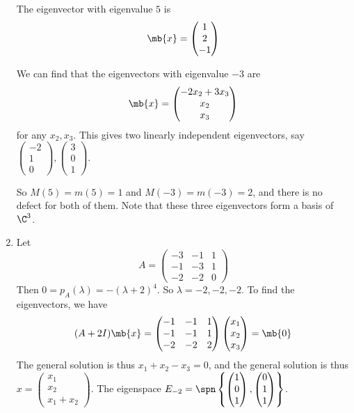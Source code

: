 \documentclass[a4paper]{article}
\begin{document}
\begin{eg}
\begin{enumerate}
     The eigenvector with eigenvalue $5$ is
     \[
     \mb{x} =
     \begin{pmatrix}
       1\\2\\-1
     \end{pmatrix}
     \]

     We can find that the eigenvectors with eigenvalue $-3$ are
     \[
     \mb{x} =
     \begin{pmatrix}
       -2x_2 + 3x_3\\x_2\\x_3
     \end{pmatrix}
     \]
     for any $x_2, x_3$. This gives two linearly independent eigenvectors, say $
     \begin{pmatrix}
       -2\\1\\0
     \end{pmatrix},
     \begin{pmatrix}
       3\\0\\1
     \end{pmatrix}$.

     So $M(5) = m(5) = 1$ and $M(-3) = m(-3) = 2$, and there is no defect for both of them. Note that these three eigenvectors form a basis of $\C^3$.
   \item Let
     \[
     A = \begin{pmatrix}
       -3&-1&1\\
       -1 & -3 & 1\\
       -2 & -2 & 0
     \end{pmatrix}
     \]
     Then $0 = p_A(\lambda) = -(\lambda+2)^4$. So $\lambda = -2, -2, -2$. To find the eigenvectors, we have
     \[
     (A + 2I)\mb{x} = 
     \begin{pmatrix}
       -1&-1&1\\
       -1 & -1 & 1\\
       -2 & -2 & 2
     \end{pmatrix}
     \begin{pmatrix}
       x_1\\x_2\\x_3
     \end{pmatrix}
     = \mb{0}
     \]
     The general solution is thus $x_1 + x_2 - x_3 = 0$, and the general solution is thus $x = 
     \begin{pmatrix}
       x_1\\x_2\\x_1 + x_2
     \end{pmatrix}$. The eigenspace $E_{-2} = \spn\left\{
     \begin{pmatrix}
       1\\0\\1
     \end{pmatrix}, 
     \begin{pmatrix}
       0\\1\\1
     \end{pmatrix}\right\}$.


\end{enumerate}
\end{eg}
\end{document}
